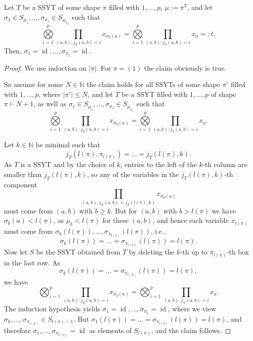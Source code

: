 \documentclass[10pt,a4paper]{amsart}
\DeclareMathOperator{\id}{\mathrm{id}}
\def\N{{\mathbb{N}}}
\newcommand{\abs}[1]{\left| #1\right|}
\begin{document}
\begin{lemma}\label{connection:lemma4}
	Let $T$ be a SSYT of some shape $\pi$ filled with $1,\ldots,p$, $\mu:=\pi^T$, and let $\sigma_1\in S_{\mu_1},\ldots,\sigma_{\pi_1}\in S_{\mu_{\pi_1}}$ such that
	\begin{displaymath}
		\bigotimes\limits_{i=1}^p\prod\limits_{(a,b):j_T(a,b)=i}x_{\sigma_b(a)}=
		\bigotimes\limits_{i=1}^p\prod\limits_{(a,b):j_T(a,b)=i}x_{a}=:t.
	\end{displaymath}
	Then, $\sigma_1=\id,\ldots,\sigma_{\pi_1}=\id$.
\end{lemma}

\begin{proof}
	We use induction on $\abs{\pi}$.
	For $\pi=(1)$ the claim obviously is true.
	
	So assume for some $N\in\N$ the claim holds for all SSYTs of some shape $\pi'$ filled with $1,\ldots,p$, where $\abs{\pi'}\leq N$,
	and let $T$ be a SSYT filled with $1,\ldots,p$ of shape $\pi\vdash N+1$,
	as well as $\sigma_1\in S_{\mu_1},\ldots,\sigma_{\pi_1}\in S_{\mu_{\pi_1}}$ such that
	\begin{displaymath}
		\bigotimes\limits_{i=1}^p\prod\limits_{(a,b):j_T(a,b)=i}x_{\sigma_b(a)}=
		\bigotimes\limits_{i=1}^p\prod\limits_{(a,b):j_T(a,b)=i}x_{a}.
	\end{displaymath}
	
	Let $k\in\N$ be minimal such that
	\begin{displaymath}
		j_T(l(\pi),\pi_{l(\pi)})=\ldots=j_T(l(\pi),k).
	\end{displaymath}
	As $T$ is a SSYT and by the choice of $k$,
	entries to the left of the $k$-th column are smaller than $j_T(l(\pi),k)$,
	so any of the variables in the $j_T(l(\pi),k)$-th component
	\begin{displaymath}
		\prod\limits_{(a,b): j_T(a,b)=j_T(l(\pi),k)}x_{\sigma_b(a)}
	\end{displaymath}
	must come from $(a,b)$ with $b\geq k$.
	But for $(a,b)$ with $b>l(\pi)$ we have $\sigma_b(a)<l(\pi)$, as $\mu_b<l(\pi)$ for these $(a,b)$,
	and hence each variable $x_{l(\pi)}$ must come from $\sigma_k(l(\pi)),\ldots,\sigma_{\lambda_{l(\pi)}}(l(\pi))$, i.e.,
	\begin{displaymath}
		\sigma_k(l(\pi))=\ldots=\sigma_{\pi_{l(\pi)}}(l(\pi))=l(\pi).
	\end{displaymath}
	Now let $S$ be the SSYT obtained from $T$ by deleting the $k$-th up to $\pi_{l(\pi)}$-th box in the last row.
	As
	\begin{displaymath}
		\sigma_k(l(\pi))=\ldots=\sigma_{\pi_{l(\pi)}}(l(\pi))=l(\pi),
	\end{displaymath}
	we have
	\begin{displaymath}
		\bigotimes_{i=1}^p\prod\limits_{(a,b):j_S(a,b)=i}x_{\sigma_b(a)}=
		\bigotimes_{i=1}^p\prod\limits_{(a,b):j_S(a,b)=i}x_{a}.
	\end{displaymath}
	The induction hypothesis yields $\sigma_1=\id,\ldots,\sigma_{\pi_1}=\id$,
	where we view $\sigma_k,\ldots,\sigma_{\pi_{l(\pi)}}\in S_{l(\pi)-1}$.
	But $\sigma_1(l(\pi))=\ldots=\sigma_{\pi_{l(\pi)}}(l(\pi))=l(\pi)$,
	and therefore $\sigma_1,\ldots,\sigma_{\pi_{l(\pi)}}=\id$ as elements of $S_{l(\pi)}$,
	and the claim follows.
\end{proof}
\end{document}
